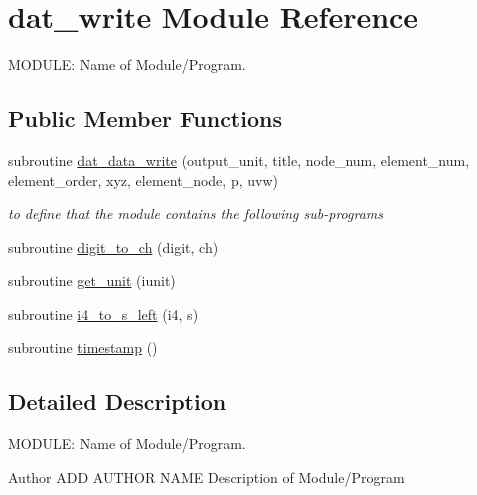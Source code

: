 \hypertarget{classdat__write}{\section{dat\-\_\-write Module Reference}
\label{classdat__write}
}


M\-O\-D\-U\-L\-E\-: Name of Module/\-Program.  


\subsection*{Public Member Functions}
\begin{DoxyCompactItemize}
\item 
subroutine \hyperlink{classdat__write_a20fe96990d93d3b6938083248eceddaf}{dat\-\_\-data\-\_\-write} (output\-\_\-unit, title, node\-\_\-num, element\-\_\-num, element\-\_\-order, xyz, element\-\_\-node, p, uvw)
\begin{DoxyCompactList}\small\item\em to define that the module contains the following sub-\/programs \end{DoxyCompactList}\item 
subroutine \hyperlink{classdat__write_ad22cbd84632a8d7a85960304073e3c54}{digit\-\_\-to\-\_\-ch} (digit, ch)
\item 
subroutine \hyperlink{classdat__write_a5e7c4e0f7f89a56954e19931b73c885c}{get\-\_\-unit} (iunit)
\item 
subroutine \hyperlink{classdat__write_a2ba7ca0a565d1807fe5a322761facb25}{i4\-\_\-to\-\_\-s\-\_\-left} (i4, s)
\item 
subroutine \hyperlink{classdat__write_ada55ae620778987b95237bcbcd4db1d6}{timestamp} ()
\end{DoxyCompactItemize}


\subsection{Detailed Description}
M\-O\-D\-U\-L\-E\-: Name of Module/\-Program. 

\begin{DoxyAuthor}{Author}
A\-D\-D A\-U\-T\-H\-O\-R N\-A\-M\-E Description of Module/\-Program 
\end{DoxyAuthor}


